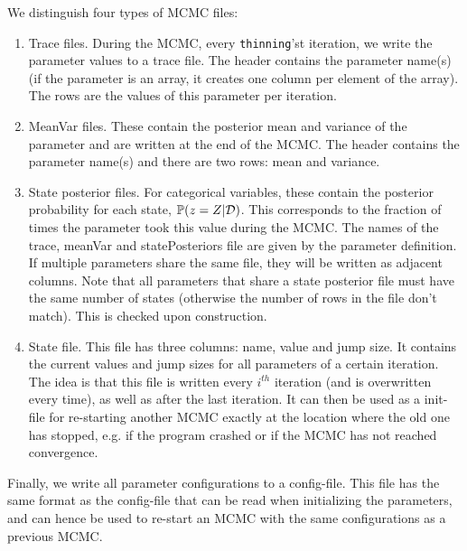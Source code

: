 \documentclass[a4paper,11pt]{article}
\def\D{{\cal D}}
\def\p{\mathbb{P}}
\newcommand{\privparam}[1]{\texttt{\textunderscore #1}}
\begin{document}
We distinguish four types of MCMC files:
 \begin{enumerate}
  \item Trace files. During the MCMC, every \privparam{thinning}'st iteration, we write the parameter values to a trace file. The header contains the parameter name(s) (if the parameter is an array, it creates one column per element of the array). The rows are the values of this parameter per iteration.
  \item MeanVar files. These contain the posterior mean and variance of the parameter and are written at the end of the MCMC. The header contains the parameter name(s) and there are two rows: mean and variance.
  \item State posterior files. For categorical variables, these contain the posterior probability for each state, $\p(z = Z | \D)$. This corresponds to the fraction of times the parameter took this value during the MCMC.
  The names of the trace, meanVar and statePosteriors file are given by the parameter definition. If multiple parameters share the same file, they will be written as adjacent columns. Note that all parameters that share a state posterior file must have the same number of states (otherwise the number of rows in the file don't match). This is checked upon construction.
  \item State file. This file has three columns: name, value and jump size. It contains the current values and jump sizes for all parameters of a certain iteration. The idea is that this file is written every $i^{th}$ iteration (and is overwritten every time), as well as after the last iteration. It can then be used as a init-file for re-starting another MCMC exactly at the location where the old one has stopped, e.g. if the program crashed or if the MCMC has not reached convergence.
 \end{enumerate}
 Finally, we write all parameter configurations to a config-file. This file has the same format as the config-file that can be read when initializing the parameters, and can hence be used to re-start an MCMC with the same configurations as a previous MCMC.
\end{document}
